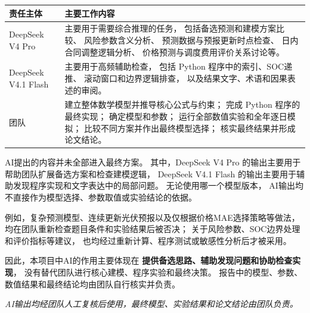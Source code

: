 \documentclass[UTF8,a4paper,11pt]{ctexart}
\begin{document}
\begin{center}
\small
\begin{tabularx}{\textwidth}{
    L{0.22\textwidth}
    Y
}
\toprule
\textbf{责任主体} &
\textbf{主要工作内容} \\
\midrule

DeepSeek V4 Pro &
主要用于需要综合推理的任务，
包括备选预测和建模方案比较、
风险参数含义分析、
预测数据与预报更新时点检查、
日内合同调整逻辑分析、
价格预测与调度费用评价关系讨论等。 \\

DeepSeek V4.1 Flash &
主要用于高频辅助检查，
包括 Python 程序中的索引、SOC递推、
滚动窗口和边界逻辑排查，
以及结果文字、术语和因果表述的审阅。 \\

团队 &
建立整体数学模型并推导核心公式与约束；
完成 Python 程序的最终实现；
确定模型和参数；
运行全部数值实验和全年逐日模拟；
比较不同方案并作出最终模型选择；
核实最终结果并形成论文结论。 \\

\bottomrule
\end{tabularx}
\end{center}

AI提出的内容并未全部进入最终方案。
其中，DeepSeek V4 Pro 的输出主要用于帮助团队扩展备选方案和检查建模逻辑，
DeepSeek V4.1 Flash 的输出主要用于辅助发现程序实现和文字表达中的局部问题。
无论使用哪一个模型版本，
AI输出均不直接作为模型选择、参数取值或实验结论的依据。

例如，复杂预测模型、连续更新光伏预报以及仅根据价格MAE选择策略等做法，
均在团队重新检查题目条件和实验结果后被否决；
关于风险参数、SOC边界处理和评价指标等建议，
也均经过重新计算、程序测试或敏感性分析后才被采用。

因此，本项目中AI的作用主要体现在
\textbf{提供备选思路、辅助发现问题和协助检查实现}，
没有替代团队进行核心建模、程序实验和最终决策。
报告中的模型、参数、数值结果和最终结论均由团队自行核实并负责。

\vfill

\begin{center}
\small
\textit{AI输出均经团队人工复核后使用，最终模型、实验结果和论文结论由团队负责。}
\end{center}
\end{document}
